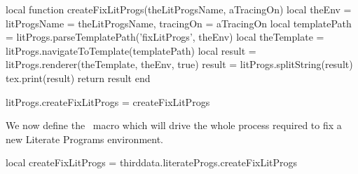 \startLuaCode
local function createFixLitProgs(theLitProgsName, aTracingOn)
  local theEnv = {
    litProgsName = theLitProgsName,
    tracingOn    = aTracingOn
  }
  local templatePath = litProgs.parseTemplatePath('fixLitProgs', theEnv)
  local theTemplate  = litProgs.navigateToTemplate(templatePath)
  local result       = litProgs.renderer(theTemplate, theEnv, true)
  result             = litProgs.splitString(result)
  tex.print(result)
  return result
end

litProgs.createFixLitProgs = createFixLitProgs
\stopLuaCode

We now define the \ConTeXt\ macro which will drive the whole process
required to fix a new Literate Programs environment.

\startMkIVCode
\def\fixLitProgs#1{
  \directlua{thirddata.literateProgs.createFixLitProgs('#1')}
}
\stopMkIVCode


\startLuaTest
local createFixLitProgs = thirddata.literateProgs.createFixLitProgs

